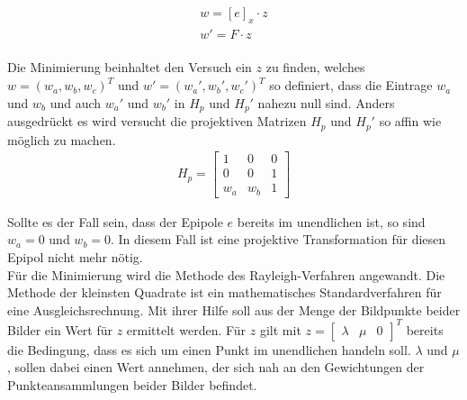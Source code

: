 
\begin{gather}
	w = [e]_x \cdot z \label{eq:w}\\ 
	w'= F\cdot z \label{eq:w'}
\end{gather}\\


Die Minimierung beinhaltet den Versuch ein $z$ zu finden, welches $w = (w_a,w_b,w_c)^T$ und $w'=(w_a',w_b',w_c')^T$ so definiert, dass die Eintrage $w_a$ und $w_b$ und auch $w_a'$ und $w_b'$ in $H_p$ und $H_p'$ nahezu null sind. Anders ausgedrückt es wird versucht die projektiven Matrizen $H_p$ und $H_p'$ so affin wie möglich zu machen\cite{ZZ}.\\ 


\begin{gather}
	H_p = 	\begin{bmatrix}
		1&0&0\\
		0&0&1\\
		w_a&w_b&1
	\end{bmatrix}
\end{gather}


Sollte es der Fall sein, dass der Epipole $e$ bereits im unendlichen ist, so sind $w_a = 0$ und $w_b = 0$. In diesem Fall ist eine projektive Transformation für diesen Epipol nicht mehr nötig.\\

Für die Minimierung wird die Methode des Rayleigh-Verfahren angewandt. Die Methode der kleinsten Quadrate ist ein mathematisches Standardverfahren für eine Ausgleichsrechnung. Mit ihrer Hilfe soll aus der Menge der Bildpunkte beider Bilder ein Wert für $z$ ermittelt werden\cite{leastSquare}. Für $z$ gilt mit $z = \begin{bmatrix}\lambda&\mu&0\end{bmatrix}^T$ bereits die Bedingung, dass es sich um einen Punkt im unendlichen handeln soll. $\lambda$ und $\mu$, sollen dabei einen Wert annehmen, der sich nah an den Gewichtungen der Punkteansammlungen beider Bilder befindet\cite{ZZ}. \\





